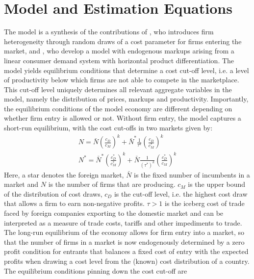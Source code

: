 \documentclass[a4paper,12pt]{article}
\begin{document}

\section{Model and Estimation Equations}\label{sec:mo}

The \citet{MelitzOttaviano2008} model is a synthesis of the contributions of \citet{Melitz2003}, who introduces firm heterogeneity through random draws of a cost parameter for firms entering the market, and \citet{Ottaviano2002}, who develop a model with endogenous markups arising from a linear consumer demand system with horizontal product differentiation. The model yields equilibrium conditions that determine a cost cut-off level, i.e. a level of productivity below which firms are not able to compete in the marketplace. This cut-off level uniquely determines all relevant aggregate variables in the model, namely the distribution of prices, markups and productivity. Importantly, the equilibrium conditions of the model economy are different depending on whether firm entry is allowed or not. Without firm entry, the model captures a short-run equilibrium, with the cost cut-offs in two markets given by:
\begin{align}
N = \bar{N} \left( \frac{c_D}{c_M} \right)^k + \bar{N}^* \frac{1}{\tau^k}\left( \frac{c_D}{c_M^*} \right)^k \label{eq:m-o-supply-n} \\
N^* = \bar{N}^* \left( \frac{c_D^*}{c_M^*} \right)^k + \bar{N} \frac{1}{\left( \tau^* \right)^k}\left( \frac{c_D^*}{c_M} \right)^k \label{eq:m-o-supply-n*}
\end{align}
Here, a star denotes the foreign market, $\bar{N}$ is the fixed number of incumbents in a market and $N$ is the number of firms that are producing. $c_M$ is the upper bound of the distribution of cost draws, $c_D$ is the cut-off level, i.e. the highest cost draw that allows a firm to earn non-negative profits. $\tau>1$ is the iceberg cost of trade faced by foreign companies exporting to the domestic market and can be interpreted as a measure of trade costs, tariffs and other impediments to trade. \\
The long-run equilibrium of the economy allows for firm entry into a market, so that the number of firms in a market is now endogenously determined by a zero profit condition for entrants that balances a fixed cost of entry with the expected profits when drawing a cost level from the (known) cost distribution of a country. The equilibrium conditions pinning down the cost cut-off are
\end{document}
